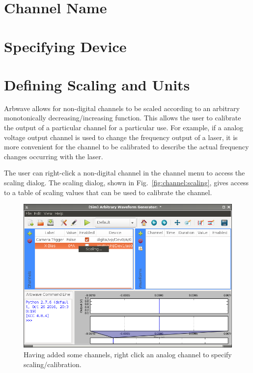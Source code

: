 \thispagestyle{fancy}
\pagestyle{fancy}
\section{Channel Name}
\section{Specifying Device}

\section{Defining Scaling and Units}
Arbwave allows for non-digital channels to be scaled according to an arbitrary
monotonically decreasing/increasing function.  This allows the user to calibrate
the output of a particular channel for a particular use.  For example, if a
analog voltage output channel is used to change the frequency output of a laser,
it is more convenient for the channel to be calibrated to describe the actual
frequency changes occurring with the laser.

The user can right-click a non-digital channel in the channel menu to access the
scaling dialog.  The scaling dialog, shown in Fig.~\ref{fig:channel:scaling}, gives
access to a table of scaling values that can be used to calibrate the channel.

\begin{figure}[ht]
  \centerline{\includegraphics[width=.8\textwidth]{figures/select-scaling}}
  \caption{Having added some channels, right click an analog channel to
  specify scaling/calibration.}
  \label{fig:channel:select-scaling}
\end{figure}


